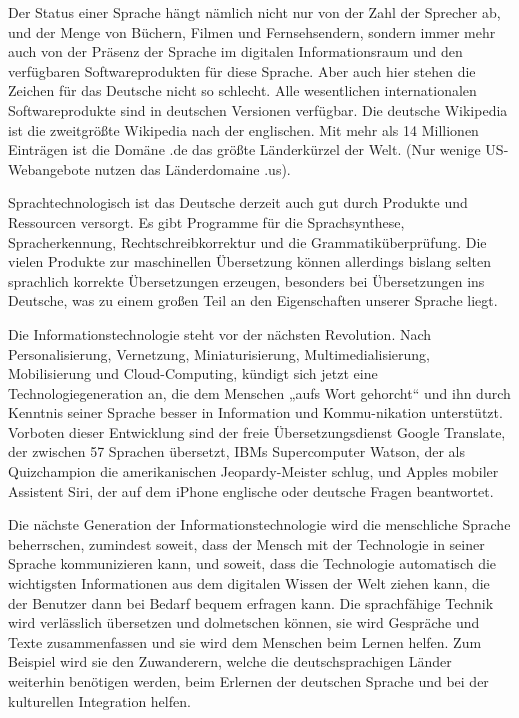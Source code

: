 \begin{multicols}{2}
Der Status einer Sprache hängt nämlich nicht nur von der Zahl der Sprecher ab, und der Menge von Büchern, Filmen und Fernsehsendern,  sondern immer mehr auch von der Präsenz der Sprache im digitalen Informationsraum und den verfügbaren Softwareprodukten für diese Sprache.  Aber auch hier stehen die Zeichen für das Deutsche nicht so schlecht. Alle wesentlichen internationalen Softwareprodukte sind in deutschen Versionen verfügbar.  Die deutsche Wikipedia ist die zweitgrößte Wikipedia nach der englischen. Mit mehr als 14 Millionen Einträgen ist die Domäne .de das größte Länderkürzel der Welt. (Nur wenige US-Webangebote nutzen das Länderdomaine .us).
 
Sprachtechnologisch ist das Deutsche derzeit auch gut durch Produkte und Ressourcen versorgt. Es gibt Programme für die Sprachsynthese, Spracherkennung, Rechtschreibkorrektur und die Grammatiküberprüfung. Die vielen Produkte zur maschinellen Übersetzung können allerdings bislang selten sprachlich korrekte Übersetzungen erzeugen, besonders bei Übersetzungen ins Deutsche, was zu einem großen Teil an den Eigenschaften unserer Sprache liegt. 

Die Informationstechnologie steht vor der nächsten Revolution. Nach Personalisierung, Vernetzung, Miniaturisierung, Multimedialisierung, Mobilisierung und Cloud-Computing, kündigt sich jetzt eine Technologiegeneration an, die dem Menschen „aufs Wort gehorcht“ und ihn durch Kenntnis seiner Sprache besser in Information und Kommu-nikation unterstützt.  Vorboten dieser Entwicklung sind der freie Übersetzungsdienst Google Translate, der zwischen 57 Sprachen übersetzt, IBMs Supercomputer Watson, der als Quizchampion die amerikanischen Jeopardy-Meister schlug, und Apples mobiler Assistent Siri, der auf dem iPhone englische oder deutsche Fragen beantwortet. 

Die nächste Generation der Informationstechnologie wird die menschliche Sprache beherrschen, zumindest soweit, dass der Mensch mit der Technologie in seiner Sprache kommunizieren kann,  und soweit, dass die Technologie automatisch die wichtigsten Informationen aus dem digitalen Wissen der Welt ziehen kann, die der Benutzer dann bei Bedarf bequem erfragen kann. Die sprachfähige Technik wird verlässlich übersetzen und dolmetschen können, sie wird Gespräche und Texte zusammenfassen und sie wird dem Menschen beim Lernen helfen.  Zum Beispiel wird sie den Zuwanderern, welche die deutschsprachigen Länder weiterhin benötigen werden, beim Erlernen der deutschen Sprache und bei der kulturellen Integration helfen.


\end{multicols}
